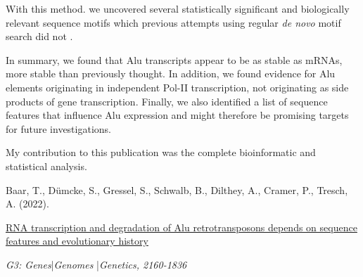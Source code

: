 With this method. we uncovered several statistically significant and
biologically relevant sequence motifs which previous attempts using regular
\textit{de novo} motif search did not \citep{Zhang2019}.
\bigbreak

\noindent In summary, we found that Alu transcripts appear to be as stable as
mRNAs, more stable than previously thought. In addition, we found evidence for
Alu elements originating in independent Pol-II transcription, not originating
as side products of gene transcription. Finally, we also identified a list of
sequence features that influence Alu expression and might therefore be
promising targets for future investigations.
\pagebreak


\null
\vfill
\noindent My contribution to this publication was the complete bioinformatic
and statistical analysis.\nopagebreak
\medskip
\begin{tcolorbox}[
  boxrule=0pt, leftrule=1pt, colframe=s-blue, colback=white, sharp corners=all]%
  \raggedright
  Baar, T., Dümcke, S., Gressel, S., Schwalb, B.,
  Dilthey, A., Cramer, P., Tresch, A. (2022).
  
  \smallskip
  \href{https://doi.org/10.1093/g3journal/jkac054}
    {RNA transcription and degradation of Alu retrotransposons depends on
    sequence features and evolutionary history}

  \smallskip
  \textit{G3: Genes}\thinspace{}|\thinspace{}\textit{Genomes}%
    \thinspace{}|\thinspace{}\textit{Genetics, 2160-1836}
\end{tcolorbox}


% 
% 

